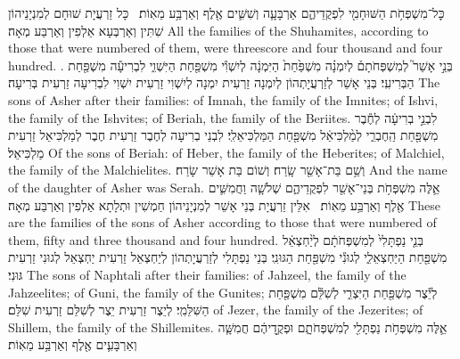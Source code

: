 {כׇּל־מִשְׁפְּחֹ֥ת הַשּׁוּחָמִ֖י לִפְקֻדֵיהֶ֑ם אַרְבָּעָ֧ה וְשִׁשִּׁ֛ים אֶ֖לֶף וְאַרְבַּ֥ע מֵאֽוֹת׃ \setuma }
{כָּל זַרְעֲיָת שׁוּחָם לְמִנְיָנֵיהוֹן שִׁתִּין וְאַרְבְּעָא אַלְפִין וְאַרְבַּע מְאָה׃}
{All the families of the Shuhamites, according to those that were numbered of them, were threescore and four thousand and four hundred. .}{}
{בְּנֵ֣י אָשֵׁר֮ לְמִשְׁפְּחֹתָם֒ לְיִמְנָ֗ה מִשְׁפַּ֙חַת֙ הַיִּמְנָ֔ה לְיִשְׁוִ֕י מִשְׁפַּ֖חַת הַיִּשְׁוִ֑י לִבְרִיעָ֕ה מִשְׁפַּ֖חַת הַבְּרִיעִֽי׃}
{בְּנֵי אָשֵׁר לְזַרְעֲיָתְהוֹן לְיִמְנָה זַרְעִית יִמְנָה לְיִשְׁוִי זַרְעִית יִשְׁוִי לִבְרִיעָה זַרְעִית בְּרִיעָה׃}
{The sons of Asher after their families: of Imnah, the family of the Imnites; of Ishvi, the family of the Ishvites; of Beriah, the family of the Beriites.}{}
{לִבְנֵ֣י בְרִיעָ֔ה לְחֶ֕בֶר מִשְׁפַּ֖חַת הַֽחֶבְרִ֑י לְמַ֨לְכִּיאֵ֔ל מִשְׁפַּ֖חַת הַמַּלְכִּיאֵלִֽי׃}
{לִבְנֵי בְרִיעָה לְחֶבֶר זַרְעִית חֶבֶר לְמַלְכִּיאֵל זַרְעִית מַלְכִּיאֵל׃}
{Of the sons of Beriah: of Heber, the family of the Heberites; of Malchiel, the family of the Malchielites.}{}
{וְשֵׁ֥ם בַּת־אָשֵׁ֖ר שָֽׂרַח׃
}
{וְשׁוֹם בַּת אָשֵׁר שָׂרַח׃}
{And the name of the daughter of Asher was Serah.}{}
{אֵ֛לֶּה מִשְׁפְּחֹ֥ת בְּנֵי־אָשֵׁ֖ר לִפְקֻדֵיהֶ֑ם שְׁלֹשָׁ֧ה וַחֲמִשִּׁ֛ים אֶ֖לֶף וְאַרְבַּ֥ע מֵאֽוֹת׃ \setuma }
{אִלֵּין זַרְעֲיָת בְּנֵי אָשֵׁר לְמִנְיָנֵיהוֹן חַמְשִׁין וּתְלָתָא אַלְפִין וְאַרְבַּע מְאָה׃}
{These are the families of the sons of Asher according to those that were numbered of them, fifty and three thousand and four hundred.}{}
{בְּנֵ֤י נַפְתָּלִי֙ לְמִשְׁפְּחֹתָ֔ם לְיַ֨חְצְאֵ֔ל מִשְׁפַּ֖חַת הַיַּחְצְאֵלִ֑י לְגוּנִ֕י מִשְׁפַּ֖חַת הַגּוּנִֽי׃}
{בְּנֵי נַפְתָּלִי לְזַרְעֲיָתְהוֹן לְיַחְצְאֵל זַרְעִית יַחְצְאֵל לְגוּנִי זַרְעִית גּוּנִי׃}
{The sons of Naphtali after their families: of Jahzeel, the family of the Jahzeelites; of Guni, the family of the Gunites;}{}
{לְיֵ֕צֶר מִשְׁפַּ֖חַת הַיִּצְרִ֑י לְשִׁלֵּ֕ם מִשְׁפַּ֖חַת הַשִּׁלֵּמִֽי׃}
{לְיֵצֶר זַרְעִית יֵצֶר לְשִׁלֵּם זַרְעִית שִׁלֵּם׃}
{of Jezer, the family of the Jezerites; of Shillem, the family of the Shillemites.}{}
{אֵ֛לֶּה מִשְׁפְּחֹ֥ת נַפְתָּלִ֖י לְמִשְׁפְּחֹתָ֑ם וּפְקֻ֣דֵיהֶ֔ם חֲמִשָּׁ֧ה וְאַרְבָּעִ֛ים אֶ֖לֶף וְאַרְבַּ֥ע מֵאֽוֹת׃}
